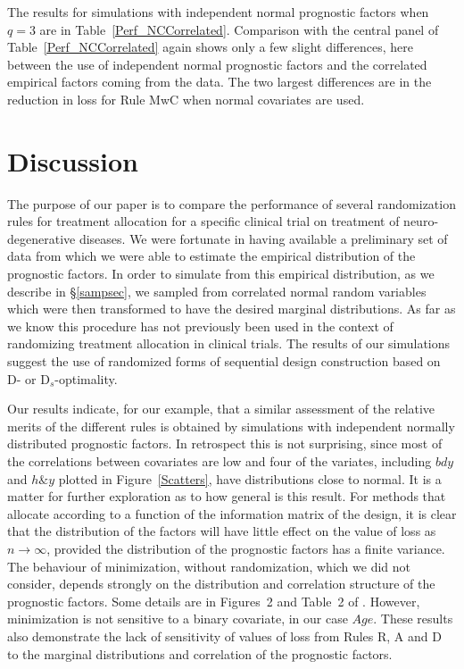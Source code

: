 \documentclass[number,12pt,review]{elsarticle}
\begin{document}
The results for simulations with independent normal prognostic factors when $q=3$ are in Table~\ref{Perf_NCCorrelated}. Comparison with the central panel of Table~\ref{Perf_NCCorrelated} again shows only a few slight differences, here between the use of independent normal prognostic factors and the correlated empirical factors coming from the data. The two largest differences are in the reduction in loss  for Rule MwC when normal covariates are used.

\section{Discussion}

The purpose of our paper is to compare the performance of several randomization rules for treatment allocation for a specific clinical trial on treatment of neuro-degenerative diseases. We were fortunate in having available a preliminary set of data from which we were able to estimate the empirical distribution of the prognostic factors. In order to simulate from this empirical distribution, as we describe in \S\ref{sampsec}, we sampled from correlated normal random variables which were then transformed to have the desired marginal distributions. As far as we know this procedure has not previously been used in the context of randomizing treatment allocation in clinical trials. The results of our simulations suggest the use of randomized forms of sequential design construction based on D- or D$_{s}$-optimality.

Our results indicate, for our example, that a similar assessment of the relative merits of the different rules is obtained by simulations with independent normally distributed prognostic factors. In retrospect this is not surprising, since most of the correlations between covariates are low and four of the variates, including $bdy$ and $h\&y$ plotted in Figure~\ref{Scatters}, have distributions close to normal. It is a matter for further exploration as to how general is this result. For methods that allocate according to a function of the information matrix of the design, it is clear that the distribution of the factors will have little effect on the value of loss as $n \rightarrow \infty$, provided the distribution of the prognostic factors has a finite variance. The behaviour of minimization, without randomization, which we did not consider, depends strongly on the distribution and correlation structure of the prognostic factors. Some details are in Figures~2 and Table~2 of \citet{aca:2002}. However, minimization is not sensitive to a binary covariate, in our case $Age$.  These results also demonstrate the lack of sensitivity of values of loss from Rules  R, A and D to the marginal distributions and correlation of the prognostic factors.
\end{document}
